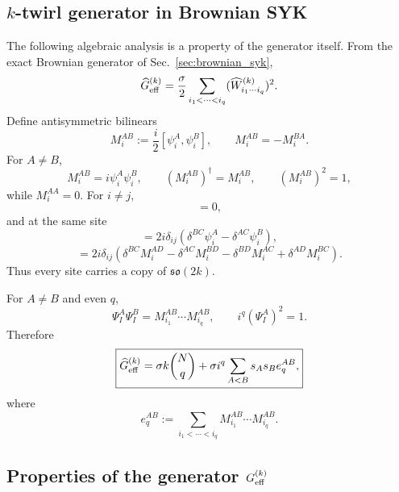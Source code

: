 \documentclass{article}
\theoremstyle{definition}
\begin{document}
\subsection{$k$-twirl generator in Brownian SYK}

The following algebraic analysis is a property of the generator itself.
From the exact Brownian generator of Sec.~\ref{sec:brownian_syk},
\begin{equation}
    \widehat G_{\rm eff}^{(k)}
    =\frac{\sigma}{2}
    \sum_{i_1<\cdots<i_q}
    (\widehat W_{i_1\cdots i_q}^{(k)})^2.
\end{equation}
Define antisymmetric bilinears
\begin{equation}
    M_i^{AB}:=\frac{i}{2}[\psi_i^A,\psi_i^B],
    \qquad
    M_i^{AB}=-M_i^{BA}.
\end{equation}
For $A\neq B$,
\begin{equation}
    M_i^{AB}=i\psi_i^A\psi_i^B,
    \qquad
    (M_i^{AB})^\dagger=M_i^{AB},
    \qquad
    (M_i^{AB})^2=1,
\end{equation}
while $M_i^{AA}=0$.  For $i\neq j$,
\begin{equation}
    [M_i^{AB},M_j^{CD}]=0,
\end{equation}
and at the same site
\begin{equation}
    [M_i^{AB},\psi_j^C]
    =2i\delta_{ij}
    (\delta^{BC}\psi_i^A-\delta^{AC}\psi_i^B),
\end{equation}
\begin{equation}
    [M_i^{AB},M_j^{CD}]
    =2i\delta_{ij}
    (\delta^{BC}M_i^{AD}-\delta^{AC}M_i^{BD}
     -\delta^{BD}M_i^{AC}+\delta^{AD}M_i^{BC}).
\end{equation}
Thus every site carries a copy of $\mathfrak{so}(2k)$.

For $A\neq B$ and even $q$,
\begin{equation}
    \Psi_I^A\Psi_I^B
    =M_{i_1}^{AB}\cdots M_{i_q}^{AB},
    \qquad
    i^q(\Psi_I^A)^2=1.
\end{equation}
Therefore
\begin{equation}
    \boxed{
    \widehat G_{\rm eff}^{(k)}
    =\sigma k\binom Nq
     +\sigma i^q\sum_{A<B}s_As_B e_q^{AB},
    }
\end{equation}
where
\begin{equation}
    e_q^{AB}
    :=\sum_{i_1<\cdots<i_q}
    M_{i_1}^{AB}\cdots M_{i_q}^{AB}.
\end{equation}

\subsection{Properties of the generator $G_{\rm eff}^{(k)}$}
\end{document}
